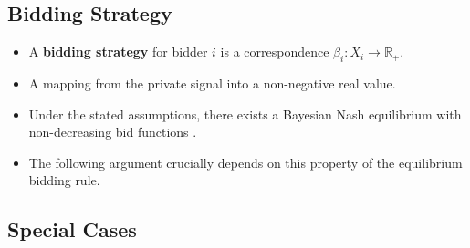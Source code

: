 \documentclass[
]{book}
\providecommand{\tightlist}{%
  \setlength{\itemsep}{0pt}\setlength{\parskip}{0pt}}
\begin{document}
\hypertarget{bidding-strategy}{%
\subsection{Bidding Strategy}\label{bidding-strategy}}

\begin{itemize}
\tightlist
\item
  A \textbf{bidding strategy} for bidder \(i\) is a correspondence \(\beta_i: X_i \to \mathbb{R}_+\).
\item
  A mapping from the private signal into a non-negative real value.
\item
  Under the stated assumptions, there exists a Bayesian Nash equilibrium with non-decreasing bid functions \citep{krishnaAuctionTheory2009}.
\item
  The following argument crucially depends on this property of the equilibrium bidding rule.
\end{itemize}

\hypertarget{special-cases}{%
\subsection{Special Cases}\label{special-cases}}
\end{document}
